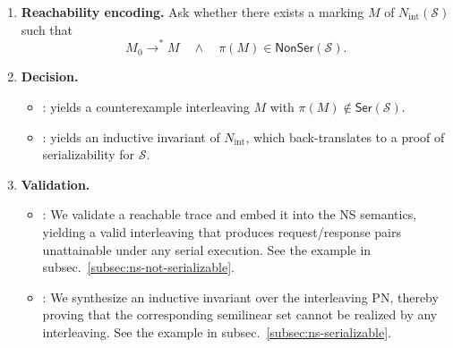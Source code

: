 \begin{enumerate}
	\item \textbf{Reachability encoding.}  
	Ask whether there exists a marking \(M\) of \(N_{\mathrm{int}}(\mathcal S)\) such that
	\[
	M_0 \xrightarrow{}^{*} M
	\quad\wedge\quad
	\pi(M)\in \mathsf{NonSer}(\mathcal S).
	\]
	
	\item \textbf{Decision.}  
	\begin{itemize}
		\item [\sat]: yields a counterexample interleaving \(M\) with
		\(\pi(M)\notin \mathsf{Ser}(\mathcal S)\).
		\item [\unsat]: yields an inductive invariant of
		\(N_{\mathrm{int}}\), which back-translates to a proof of
		serializability for \(\mathcal S\).
	\end{itemize}



\item \textbf{Validation.}  

	\begin{itemize}
		
		\item[\sat]: We validate a reachable trace and embed it into the NS semantics, yielding a valid interleaving that produces request/response pairs unattainable under any serial execution.
		See the example in subsec.~\ref{subsec:ns-not-serializable}.
		
		\item[\unsat]: We synthesize an inductive invariant over the interleaving PN, thereby proving that the corresponding semilinear set cannot be realized by any interleaving.
		See the example in subsec.~\ref{subsec:ns-serializable}.
		
		
	
\end{itemize}

\end{enumerate}

